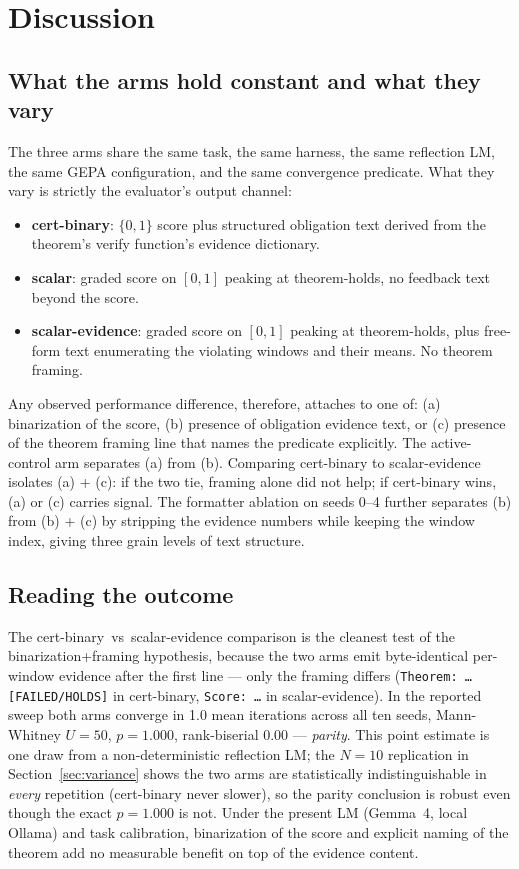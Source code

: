 \section{Discussion}\label{sec:discussion}

\subsection{What the arms hold constant and what they vary}

The three arms share the same task, the same harness, the same
reflection LM, the same GEPA configuration, and the same convergence
predicate.  What they vary is strictly the evaluator's output
channel:

\begin{itemize}[leftmargin=*,itemsep=2pt,topsep=2pt]
\item \textbf{cert-binary}: $\{0,1\}$ score plus structured
obligation text derived from the theorem's verify function's
evidence dictionary.
\item \textbf{scalar}: graded score on $[0, 1]$ peaking at theorem-holds, no
feedback text beyond the score.
\item \textbf{scalar-evidence}: graded score on $[0, 1]$ peaking at
theorem-holds, plus free-form text enumerating the violating
windows and their means.  No theorem framing.
\end{itemize}

Any observed performance difference, therefore, attaches to one of:
(a) binarization of the score, (b) presence of obligation
evidence text, or (c) presence of the theorem framing line that
names the predicate explicitly.  The active-control arm separates
(a) from (b).  Comparing cert-binary to scalar-evidence isolates
(a) + (c): if the two tie, framing alone did not help; if
cert-binary wins, (a) or (c) carries signal.  The formatter
ablation on seeds 0--4 further separates (b) from
(b) + (c) by stripping the evidence numbers while keeping the
window index, giving three grain levels of text structure.

\subsection{Reading the outcome}

The cert-binary~vs~scalar-evidence comparison is the cleanest
test of the binarization+framing hypothesis, because the two arms
emit byte-identical per-window evidence after the first line ---
only the framing differs (\texttt{Theorem: \dots [FAILED/HOLDS]}
in cert-binary, \texttt{Score: \dots} in scalar-evidence).  In the
reported sweep both arms converge in 1.0 mean iterations across all
ten seeds, Mann-Whitney $U=50$, $p=1.000$, rank-biserial $0.00$ ---
\emph{parity}.  This point estimate is one draw from a
non-deterministic reflection LM; the $N=10$ replication in
Section~\ref{sec:variance} shows the two arms are statistically
indistinguishable in \emph{every} repetition (cert-binary never
slower), so the parity conclusion is robust even though the exact
$p=1.000$ is not.  Under the present LM (Gemma~4, local Ollama) and
task calibration, binarization of the score and explicit naming of
the theorem add no measurable benefit on top of the evidence
content.

